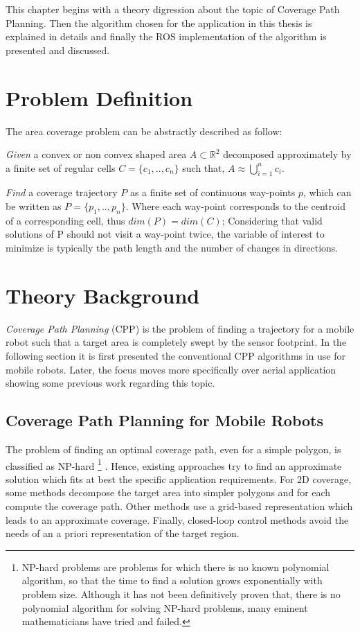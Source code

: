This chapter begins with a theory digression about the topic of Coverage Path Planning. Then the algorithm chosen for the application in this thesis is explained in details and finally the ROS implementation of the algorithm is presented and discussed.
\section{Problem Definition} %
\label{sec:problem_definition}
The area coverage problem can be abstractly described as follow:\par 
\textit{Given} a convex or non convex shaped area $A \subset \mathbb{R}^2$ decomposed approximately by a finite set of regular cells $C = \{c_1, .., c_n\}$ such that, $A \approx \bigcup_{i=1}^{n} c_i$.\par
\textit{Find} a coverage trajectory $P$ as a finite set of continuous way-points $p$, which can be written as $P = \{p_1, .., p_n\}$. Where each way-point corresponds to the centroid of a corresponding cell, thus $dim(P) = dim(C)$;
Considering that valid solutions of P should not visit a way-point twice, the variable of interest to minimize is typically the path length and the number of changes in directions.
\section{Theory Background} %
\label{sec:theory_background}
\textit{Coverage Path Planning} (CPP) is the problem of finding a trajectory for a mobile robot such that a target area is completely swept by the sensor footprint. In the following section it is first presented the conventional CPP algorithms in use for mobile robots. Later, the focus moves more specifically over aerial application showing some previous work regarding this topic.

\subsection{Coverage Path Planning for Mobile Robots} %
\label{sub:coverage_path_planning_for_mobile_robots}
The problem of finding an optimal coverage path, even for a simple polygon, is classified as NP-hard \footnote{NP-hard problems are problems for which there is no known polynomial algorithm, so that the time to find a solution grows exponentially with problem size. Although it has not been definitively proven that, there is no polynomial algorithm for solving NP-hard problems, many eminent mathematicians have tried and failed.} \cite{ARKIN200025}. Hence, existing approaches try to find an approximate solution which fits at best the specific application requirements. For 2D coverage, some methods decompose the target area into simpler polygons and for each compute the coverage path. Other methods use a grid-based representation which leads to an approximate coverage. Finally, closed-loop control methods avoid the needs of an a priori representation of the target region.

